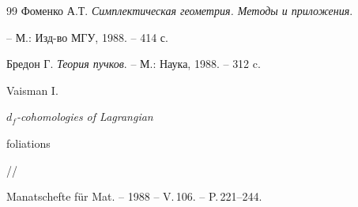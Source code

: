 \begin{thebibliography}{99}
Фоменко А.Т. {\em Симплектическая геометрия. Методы и приложения}.


-- М.: Изд-во МГУ, 1988. -- 414 с.




Бредон Г. {\em Теория пучков}. -- М.: Наука, 1988. -- 312 c.




Vaisman I. {\it $d_f$-cohomologies of Lagrangian


foliations} //


Manatschefte f\"ur Mat. -- 1988 -- V.\,106. -- P.\,221--244.





\end{thebibliography}





\vskip 2cm












\label{end}





